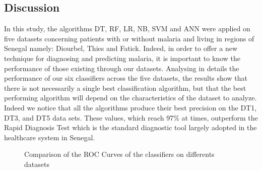 \subsection{Discussion}
In this study, the algorithms DT, RF, LR, NB, SVM and ANN were applied on five datasets concerning patients with or without malaria and living in regions of Senegal namely: Diourbel, Thies and Fatick. Indeed, in order to offer a new technique for diagnosing and predicting malaria, it is important to know the performance of those existing through our datasets.
Analysing in details the performance of our six classifiers across the five datasets, the results show that there is not necessarily a single best classification algorithm, but that the best performing algorithm will depend on the characteristics of the dataset to analyze. Indeed we notice that all the algorithms produce their best precision on the DT1, DT3, and DT5 data sets. These values, which reach 97\% at times, outperform the Rapid Diagnosis Test which is the standard diagnostic tool largely adopted in the healthcare system in Senegal.
\begin{figure}
\caption{Comparison of the ROC Curves of the classifiers on differents datasets}
\end{figure}
